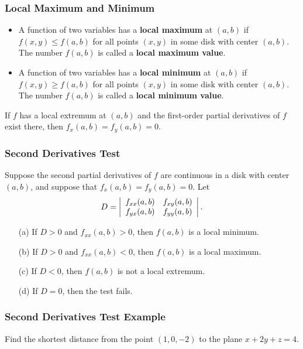 \documentclass{beamer}
\begin{document}
\begin{frame}
\frametitle{Local Maximum and Minimum}

\begin{Definition}
\begin{itemize}
\item A function of two variables has a {\bf local maximum} at $(a, b)$ if $f(x, y)\leq f(a, b)$ for all points $(x, y)$ in some disk with center $(a, b)$. The number $f(a, b)$ is called a {\bf local maximum value}. 
\item A function of two variables has a {\bf local minimum} at $(a, b)$ if $f(x, y)\geq f(a, b)$ for all points $(x, y)$ in some disk with center $(a, b)$. The number $f(a, b)$ is called a {\bf local minimum value}. 
\end{itemize}
\end{Definition}

\begin{Theorem}
If $f$ has a local extremum at $(a, b)$ and the first-order partial derivatives of $f$ exist there, then $f_x(a, b) = f_y(a, b) = 0$.
\end{Theorem}

\end{frame}


\begin{frame}
\frametitle{Second Derivatives Test}
Suppose the second partial derivatives of $f$ are continuous in a disk with center $(a, b)$, and suppose that $f_x(a, b) = f_y(a, b) = 0$. Let
$$
D = \left|\begin{array}{c c} f_{xx}(a, b)	&	f_{xy}(a, b)\\ f_{yx}(a, b)	&	f_{yy}(a, b)\end{array}\right|.
$$
\begin{enumerate}
\item[(a)] If $D >0$ and $f_{xx} (a, b) > 0$, then $f(a,b)$ is a local minimum.
\item[(b)] If $D > 0$ and $f_{xx}(a, b) < 0$, then $f(a, b)$ is a local maximum.
\item[(c)] If $D < 0$, then $f(a, b)$ is not a local extremum.
\item[(d)] If $D = 0$, then the test fails.
\end{enumerate}

\end{frame}


\begin{frame}[t]
\frametitle{Second Derivatives Test Example}
\begin{Example}
Find the shortest distance from the point $(1, 0, -2)$ to the plane $x + 2y + z = 4$.
\end{Example}
\end{frame}
\end{document}

